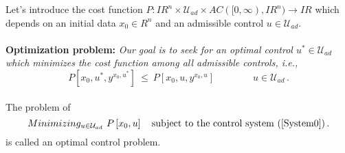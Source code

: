 \documentclass[letterpaper,12pt]{article}
\numberwithin{equation}{section}
\newcommand{\R}{\mathbb{R}}
\def\R{I\!\!R}
\begin{document}
Let's introduce the cost function $P:\R^n\times\mathcal{U}_{ad}\times AC([0,\infty),\R^n)\to\R$ which depends on an initial data $x_0\in R^n$ and an admissible control $u\in\mathcal{U}_{ad}$.
\quad\\
\quad\\
{\bf Optimization problem:} {\it Our goal is to seek for an optimal control $u^*\in\mathcal{U}_{ad}$ which minimizes the cost function among all admissible controls, i.e.,
\[
P\left[x_0,u^*, y^{x_0,u^*}\right]~\leq~P\left[x_0,u,y^{x_0,u}\right]\qquad\qquad u\in\mathcal{U}_{ad}\,.
\]}
\quad\\
The problem of 
\[
Minimizing_{u\in\mathcal{U}_{ad}}~P\left[x_0,u\right]\quad\mathrm{subject~to~the~control~system}~(\ref{System0})\,.
\]
is called an optimal control problem.
\end{document}
